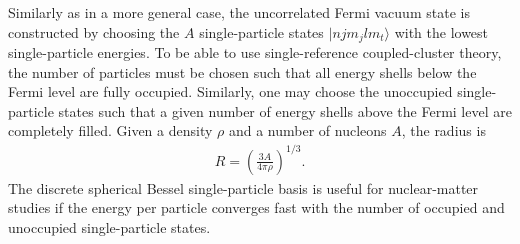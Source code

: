 \documentclass[a4paper,12pt]{report}
\begin{document}
Similarly as in a more general case, the uncorrelated 
Fermi vacuum state is constructed by choosing the $A$
single-particle states $|njm_{j}lm_{t}\rangle $ with the 
lowest single-particle energies. To be able to use
single-reference coupled-cluster theory, the number of 
particles must be chosen such that all energy shells 
below the Fermi level are fully occupied. Similarly, one may
choose the unoccupied single-particle states such that
a given number of energy shells above the Fermi level
are completely filled. 
Given a density $\rho $ and a number of nucleons $A$,
the radius is
\begin{align}
  R = \left( \frac{3A}{4\pi \rho }\right)^{1/3}.
\end{align}
The discrete spherical Bessel single-particle basis 
is useful for nuclear-matter studies if the energy
per particle converges fast with the number of occupied
and unoccupied single-particle states. 
\end{document}
